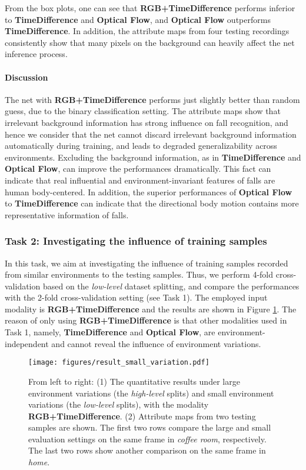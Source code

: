 \documentclass[runningheads]{llncs}
\begin{document}
From the box plots, one can see that {\bf RGB+TimeDifference} performs inferior to {\bf TimeDifference} and {\bf Optical Flow}, and {\bf Optical Flow} outperforms {\bf TimeDifference}. In addition, the attribute maps from four testing recordings consistently show that many pixels on the background can heavily affect the net inference process. 


\paragraph{Discussion}
The net with {\bf RGB+TimeDifference} performs just slightly better than random guess, due to the binary classification setting. The attribute maps show that irrelevant background information has strong influence on fall recognition, and hence we consider that the net cannot discard irrelevant background information automatically during training, and leads to degraded generalizability across environments. Excluding the background information, as in {\bf TimeDifference} and {\bf Optical Flow}, can improve the performances dramatically. This fact can indicate that real influential and environment-invariant features of falls are human body-centered. In addition, the superior performances of {\bf Optical Flow} to {\bf TimeDifference} can indicate that the directional body motion contains more representative information of falls. 


\subsubsection{Task 2: Investigating the influence of training samples}
In this task, we aim at investigating the influence of training samples recorded from similar environments to the testing samples. Thus, we perform 4-fold cross-validation based on the {\em low-level} dataset splitting, and compare the performances with the 2-fold cross-validation setting (see Task 1). The employed input modality is {\bf RGB+TimeDifference} and the results are shown in Figure \ref{fig:small_environment_variation}. The reason of only using {\bf RGB+TimeDifference} is that other modalities used in Task 1, namely, {\bf TimeDifference} and {\bf Optical Flow}, are environment-independent and cannot reveal the influence of environment variations. 



\begin{figure}
\centering
\texttt{[image: figures/result\_small\_variation.pdf]}
\caption{From left to right: (1) The quantitative results under large environment variations (the {\em high-level} splits) and small environment variations (the {\em low-level} splits), with the modality {\bf RGB+TimeDifference}. (2) Attribute maps from two testing samples are shown. The first two rows compare the large and small evaluation settings on the same frame in {\em coffee room}, respectively. The last two rows show another comparison on the same frame in {\em home}. }
\label{fig:small_environment_variation}
\end{figure}
\end{document}

